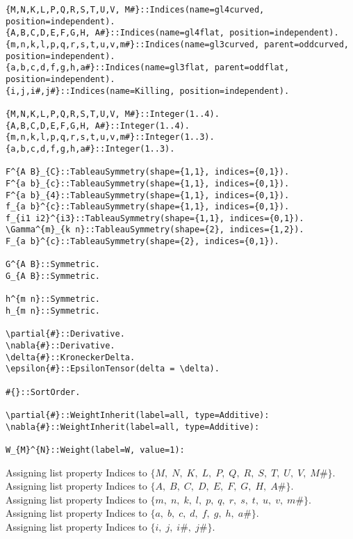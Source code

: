 \documentclass[11pt]{article}
\begin{document}
{\color[named]{Blue}\begin{verbatim}
{M,N,K,L,P,Q,R,S,T,U,V, M#}::Indices(name=gl4curved, position=independent).
{A,B,C,D,E,F,G,H, A#}::Indices(name=gl4flat, position=independent).
{m,n,k,l,p,q,r,s,t,u,v,m#}::Indices(name=gl3curved, parent=oddcurved, position=independent).
{a,b,c,d,f,g,h,a#}::Indices(name=gl3flat, parent=oddflat, position=independent).
{i,j,i#,j#}::Indices(name=Killing, position=independent).

{M,N,K,L,P,Q,R,S,T,U,V, M#}::Integer(1..4).
{A,B,C,D,E,F,G,H, A#}::Integer(1..4).
{m,n,k,l,p,q,r,s,t,u,v,m#}::Integer(1..3).
{a,b,c,d,f,g,h,a#}::Integer(1..3).

F^{A B}_{C}::TableauSymmetry(shape={1,1}, indices={0,1}).
F^{a b}_{c}::TableauSymmetry(shape={1,1}, indices={0,1}).
F^{a b}_{4}::TableauSymmetry(shape={1,1}, indices={0,1}).
f_{a b}^{c}::TableauSymmetry(shape={1,1}, indices={0,1}).
f_{i1 i2}^{i3}::TableauSymmetry(shape={1,1}, indices={0,1}).
\Gamma^{m}_{k n}::TableauSymmetry(shape={2}, indices={1,2}).
F_{a b}^{c}::TableauSymmetry(shape={2}, indices={0,1}).

G^{A B}::Symmetric.
G_{A B}::Symmetric.

h^{m n}::Symmetric.
h_{m n}::Symmetric.

\partial{#}::Derivative.
\nabla{#}::Derivative.
\delta{#}::KroneckerDelta.
\epsilon{#}::EpsilonTensor(delta = \delta).

#{}::SortOrder.

\partial{#}::WeightInherit(label=all, type=Additive):
\nabla{#}::WeightInherit(label=all, type=Additive):

W_{M}^{N}::Weight(label=W, value=1):
\end{verbatim}}
Assigning list property Indices to $\{M,\; N,\; K,\; L,\; P,\; Q,\; R,\; S,\; T,\; U,\; V,\; M\#\}$.
\\
Assigning list property Indices to $\{A,\; B,\; C,\; D,\; E,\; F,\; G,\; H,\; A\#\}$.
\\
Assigning list property Indices to $\{m,\; n,\; k,\; l,\; p,\; q,\; r,\; s,\; t,\; u,\; v,\; m\#\}$.
\\
Assigning list property Indices to $\{a,\; b,\; c,\; d,\; f,\; g,\; h,\; a\#\}$.
\\
Assigning list property Indices to $\{i,\; j,\; i\#,\; j\#\}$.
\\
\end{document}
